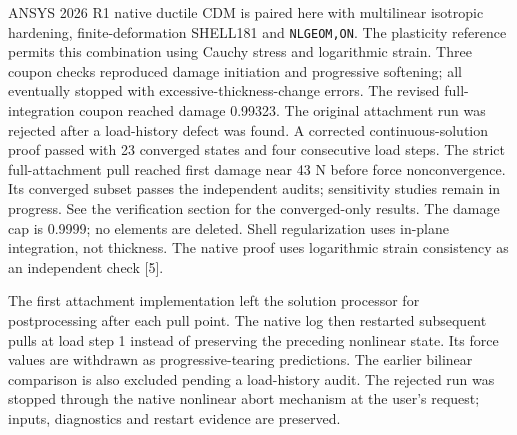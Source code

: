 \documentclass[10pt,a4paper]{article}
\newcommand{\ReportHeading}[1]{\par\vspace{6pt}{\large\bfseries\color{Teal}#1}\par\vspace{3pt}}
\begin{document}
ANSYS 2026 R1 native ductile CDM is paired here with multilinear isotropic hardening, finite-deformation SHELL181 and \texttt{NLGEOM,ON}. The plasticity reference permits this combination using Cauchy stress and logarithmic strain. Three coupon checks reproduced damage initiation and progressive softening; all eventually stopped with excessive-thickness-change errors. The revised full-integration coupon reached damage 0.99323. The original attachment run was rejected after a load-history defect was found. A corrected continuous-solution proof passed with 23 converged states and four consecutive load steps. The strict full-attachment pull reached first damage near 43 N before force nonconvergence. Its converged subset passes the independent audits; sensitivity studies remain in progress. See the verification section for the converged-only results. The damage cap is 0.9999; no elements are deleted. Shell regularization uses in-plane integration, not thickness. The native proof uses logarithmic strain consistency as an independent check [5].

\ReportHeading{What the existing result establishes}
The first attachment implementation left the solution processor for postprocessing after each pull point. The native log then restarted subsequent pulls at load step 1 instead of preserving the preceding nonlinear state. Its force values are withdrawn as progressive-tearing predictions. The earlier bilinear comparison is also excluded pending a load-history audit. The rejected run was stopped through the native nonlinear abort mechanism at the user's request; inputs, diagnostics and restart evidence are preserved.
\end{document}
